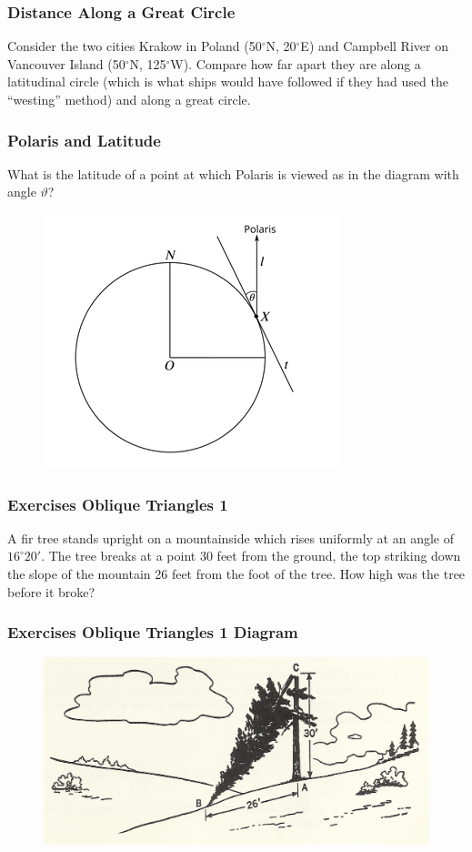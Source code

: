 \documentclass[xcolor=dvipsnames]{beamer}
\begin{document}
\begin{frame}
  \frametitle{Distance Along a Great Circle}
  Consider the two cities Krakow in Poland (50$^{\circ}$N,
  20$^{\circ}$E) and Campbell River on Vancouver Island
  (50$^{\circ}$N, 125$^{\circ}$W). Compare how far apart they are
  along a latitudinal circle (which is what ships would have followed
  if they had used the ``westing'' method) and along a great circle.
\end{frame}

\begin{frame}
  \frametitle{Polaris and Latitude}
  What is the latitude of a point at which Polaris is viewed as in the
  diagram with angle $\vartheta$?
    \begin{figure}[h]
    \includegraphics[scale=.5]{./polaris.png}
  \end{figure}
\end{frame}

\begin{frame}
  \frametitle{Exercises Oblique Triangles 1}
  A fir tree stands upright on a mountainside which rises uniformly at
  an angle of $16^{\circ}20'$. The tree breaks at a point 30 feet from
  the ground, the top striking down the slope of the mountain 26 feet
  from the foot of the tree. How high was the tree before it broke?
\end{frame}

\begin{frame}
  \frametitle{Exercises Oblique Triangles 1 Diagram}
    \begin{figure}[h]
    \includegraphics[scale=1]{./oblique-01.png}
  \end{figure}
\end{frame}
\end{document}
